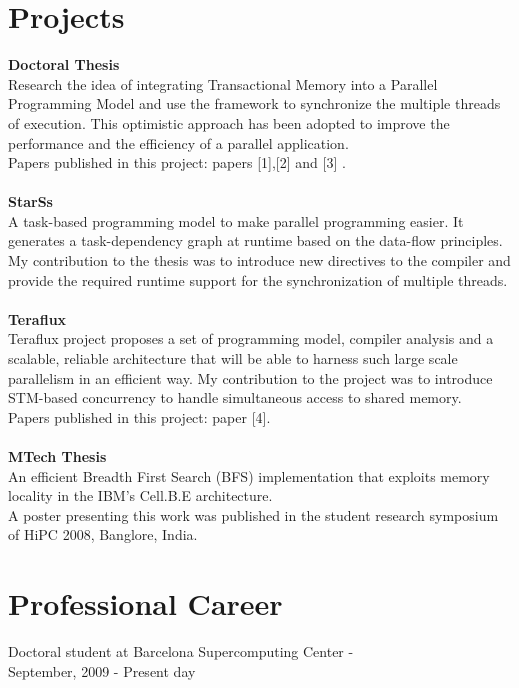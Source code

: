 \documentclass[margin]{res}
\begin{document}
\begin{resume}
\section{Projects} 
{\bf Doctoral Thesis} \\
Research  the idea of integrating Transactional Memory into a Parallel Programming Model and use the framework to synchronize the multiple threads of execution. 
This optimistic approach has been adopted to improve the performance and the efficiency of a parallel application.\\ 
Papers published in this project: papers [1],[2] and [3] .\\\\
%
{\bf StarSs}\\
A task-based programming model to make parallel programming easier. It generates a task-dependency graph at runtime based on the data-flow principles. 
My contribution to the thesis was to introduce new directives to the compiler and provide the required runtime support for the synchronization of multiple threads. \\\\
%
{\bf Teraflux}  \\
Teraflux project proposes a set of programming model, compiler analysis and a scalable, reliable architecture that will be able to harness such large scale parallelism in an efficient way.
My contribution to the project was to introduce STM-based concurrency to handle simultaneous access to shared memory.\\
Papers published in this project: paper [4].\\\\
%
{\bf MTech Thesis} \\
An efficient Breadth First Search (BFS) implementation that exploits memory locality in the IBM's Cell.B.E architecture. \\ 
A poster presenting this work was published in the student research symposium of HiPC 2008, Banglore, India.
%
\section{Professional Career}
%
Doctoral student at Barcelona Supercomputing Center - \\ 
September, 2009 - Present day
%

\end{resume}
\end{document}
